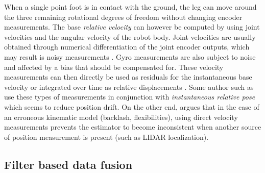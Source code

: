 When a single point foot is in contact with the ground, the leg can move around the three remaining rotational degrees of freedom without changing encoder measurements.
The base \textit{relative velocity} can however be computed by using joint velocities and the angular velocity of the robot body. 
Joint velocities are usually obtained through numerical differentiation of the joint encoder outputs, which may result is noisy measurements \cite{rotella2016imu}.
Gyro measurements are also subject to noise and affected by a bias that should be compensated for. These velocity measurements can then directly be used as
residuals for the instantaneous base velocity \cite{bloesch2013stateSlippery,bledt2018cheetah} or integrated over time as relative 
displacements \cite{ma2012robust, wisth2020preintegrated}. Some author such as \cite{bloesch2013stateSlippery, bledt2018cheetah} 
use these types of measurements in conjunction with \textit{instantaneous relative pose} which seems to reduce position drift. On the other end,
\cite{fallon2014drift} argues that in the case of an erroneous kinematic model (backlash, flexibilities), using direct velocity measurements
prevents the estimator to become inconsistent when another source of position measurement is present (such as LIDAR localization).  




\subsection{Filter based data fusion}


